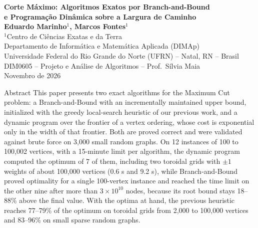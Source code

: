 

\begin{center}
{\Large\bfseries Corte Máximo: Algoritmos Exatos por Branch-and-Bound\\ e Programação Dinâmica sobre a Largura de Caminho}\\[10pt]
{\bfseries Eduardo Marinho$^1$, Marcos Fontes$^1$}\\[6pt]
$^1$Centro de Ciências Exatas e da Terra\\
Departamento de Informática e Matemática Aplicada (DIMAp)\\
Universidade Federal do Rio Grande do Norte (UFRN) -- Natal, RN -- Brasil\\
DIM0605 -- Projeto e Análise de Algoritmos -- Prof.\ Sílvia Maia\\
Novembro de 2026
\end{center}
\vspace{6pt}
\begin{resumobloco}{Abstract}
This paper presents two exact algorithms for the Maximum Cut problem: a Branch-and-Bound with an incrementally maintained upper bound, initialized with the greedy local-search heuristic of our previous work, and a dynamic program over the frontier of a vertex ordering, whose cost is exponential only in the width of that frontier. Both are proved correct and were validated against brute force on 3,000 small random graphs. On 12 instances of 100 to 100,002 vertices, with a 15-minute limit per algorithm, the dynamic program computed the optimum of 7 of them, including two toroidal grids with $\pm1$ weights of about 100,000 vertices (0.6 s and 9.2 s), while Branch-and-Bound proved optimality for a single 100-vertex instance and reached the time limit on the other nine after more than $3\times10^{10}$ nodes, because its root bound stays 18--88\% above the final value. With the optima at hand, the previous heuristic reaches 77--79\% of the optimum on toroidal grids from 2,000 to 100,000 vertices and 83--96\% on small sparse random graphs.
\end{resumobloco}
\vspace{8pt}
